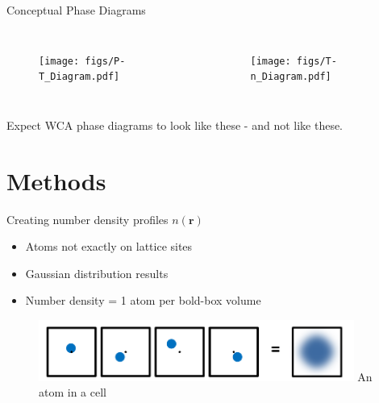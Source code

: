 \documentclass{beamer}
\renewcommand{\vec}[1]{\mathbf{#1}}
\begin{document}


\begin{frame}{Conceptual Phase Diagrams}
	\begin{columns}[t]
        \begin{figure}
            \centering
            \texttt{[image: figs/P-T\_Diagram.pdf]}
          \end{figure}
		 \begin{figure}
            \centering
            \texttt{[image: figs/T-n\_Diagram.pdf]}
          \end{figure}
	\end{columns}	
    \vspace{+1em}
Expect WCA phase diagrams to look like these - and not like these.	
\end{frame}

 
\section*{Methods}

\begin{frame}{Creating number density profiles $n(\vec r)$}
    \begin{itemize}
	    \item Atoms not exactly on lattice sites
		\item Gaussian distribution results
		\item Number density = 1 atom per bold-box volume
	\end{itemize}	
	
    \begin{figure}
       \centering
       \includegraphics[height=2cm]{Ensemble_Gaussian.png}
       \label{fig:Ensemble_Gaus}
        An atom in a cell
     \end{figure}     
\end{frame}	
\end{document}
